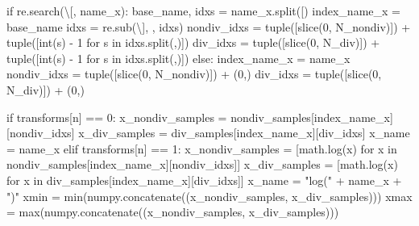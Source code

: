 \documentclass[
  letterpaper,
  DIV=11,
  numbers=noendperiod]{scrartcl}
\newenvironment{Shaded}{\begin{snugshade}}{\end{snugshade}}
\newcommand{\BuiltInTok}[1]{\textcolor[rgb]{0.00,0.23,0.31}{#1}}
\newcommand{\ControlFlowTok}[1]{\textcolor[rgb]{0.00,0.23,0.31}{#1}}
\newcommand{\DecValTok}[1]{\textcolor[rgb]{0.68,0.00,0.00}{#1}}
\newcommand{\KeywordTok}[1]{\textcolor[rgb]{0.00,0.23,0.31}{#1}}
\newcommand{\NormalTok}[1]{\textcolor[rgb]{0.00,0.23,0.31}{#1}}
\newcommand{\OperatorTok}[1]{\textcolor[rgb]{0.37,0.37,0.37}{#1}}
\newcommand{\StringTok}[1]{\textcolor[rgb]{0.13,0.47,0.30}{#1}}
\begin{document}
\begin{Shaded}
\begin{Highlighting}[]
      \ControlFlowTok{if}\NormalTok{ re.search(}\StringTok{\textquotesingle{}\textbackslash{}[\textquotesingle{}}\NormalTok{, name\_x):}
\NormalTok{        base\_name, idxs }\OperatorTok{=}\NormalTok{ name\_x.split(}\StringTok{\textquotesingle{}[\textquotesingle{}}\NormalTok{)}
\NormalTok{        index\_name\_x }\OperatorTok{=}\NormalTok{ base\_name}
\NormalTok{        idxs }\OperatorTok{=}\NormalTok{ re.sub(}\StringTok{\textquotesingle{}\textbackslash{}]\textquotesingle{}}\NormalTok{, }\StringTok{\textquotesingle{}\textquotesingle{}}\NormalTok{, idxs)}
\NormalTok{        nondiv\_idxs }\OperatorTok{=} \BuiltInTok{tuple}\NormalTok{([}\BuiltInTok{slice}\NormalTok{(}\DecValTok{0}\NormalTok{, N\_nondiv)]) }\OperatorTok{+} \BuiltInTok{tuple}\NormalTok{([}\BuiltInTok{int}\NormalTok{(s) }\OperatorTok{{-}} \DecValTok{1} \ControlFlowTok{for}\NormalTok{ s }\KeywordTok{in}\NormalTok{ idxs.split(}\StringTok{\textquotesingle{},\textquotesingle{}}\NormalTok{)])}
\NormalTok{        div\_idxs }\OperatorTok{=} \BuiltInTok{tuple}\NormalTok{([}\BuiltInTok{slice}\NormalTok{(}\DecValTok{0}\NormalTok{, N\_div)]) }\OperatorTok{+} \BuiltInTok{tuple}\NormalTok{([}\BuiltInTok{int}\NormalTok{(s) }\OperatorTok{{-}} \DecValTok{1} \ControlFlowTok{for}\NormalTok{ s }\KeywordTok{in}\NormalTok{ idxs.split(}\StringTok{\textquotesingle{},\textquotesingle{}}\NormalTok{)])}
      \ControlFlowTok{else}\NormalTok{:}
\NormalTok{        index\_name\_x }\OperatorTok{=}\NormalTok{ name\_x}
\NormalTok{        nondiv\_idxs }\OperatorTok{=} \BuiltInTok{tuple}\NormalTok{([}\BuiltInTok{slice}\NormalTok{(}\DecValTok{0}\NormalTok{, N\_nondiv)]) }\OperatorTok{+}\NormalTok{ (}\DecValTok{0}\NormalTok{,)}
\NormalTok{        div\_idxs }\OperatorTok{=} \BuiltInTok{tuple}\NormalTok{([}\BuiltInTok{slice}\NormalTok{(}\DecValTok{0}\NormalTok{, N\_div)]) }\OperatorTok{+}\NormalTok{ (}\DecValTok{0}\NormalTok{,)}
      
      \ControlFlowTok{if}\NormalTok{ transforms[n] }\OperatorTok{==} \DecValTok{0}\NormalTok{:}
\NormalTok{        x\_nondiv\_samples }\OperatorTok{=}\NormalTok{ nondiv\_samples[index\_name\_x][nondiv\_idxs]}
\NormalTok{        x\_div\_samples }\OperatorTok{=}\NormalTok{ div\_samples[index\_name\_x][div\_idxs]}
\NormalTok{        x\_name }\OperatorTok{=}\NormalTok{ name\_x}
      \ControlFlowTok{elif}\NormalTok{ transforms[n] }\OperatorTok{==} \DecValTok{1}\NormalTok{:}
\NormalTok{        x\_nondiv\_samples }\OperatorTok{=}\NormalTok{ [math.log(x) }\ControlFlowTok{for}\NormalTok{ x }\KeywordTok{in}\NormalTok{ nondiv\_samples[index\_name\_x][nondiv\_idxs]]}
\NormalTok{        x\_div\_samples }\OperatorTok{=}\NormalTok{ [math.log(x) }\ControlFlowTok{for}\NormalTok{ x }\KeywordTok{in}\NormalTok{ div\_samples[index\_name\_x][div\_idxs]]}
\NormalTok{        x\_name }\OperatorTok{=} \StringTok{"log("} \OperatorTok{+}\NormalTok{ name\_x }\OperatorTok{+} \StringTok{")"}
\NormalTok{      xmin }\OperatorTok{=} \BuiltInTok{min}\NormalTok{(numpy.concatenate((x\_nondiv\_samples, x\_div\_samples)))}
\NormalTok{      xmax }\OperatorTok{=} \BuiltInTok{max}\NormalTok{(numpy.concatenate((x\_nondiv\_samples, x\_div\_samples)))}
      

\end{Highlighting}
\end{Shaded}
\end{document}

